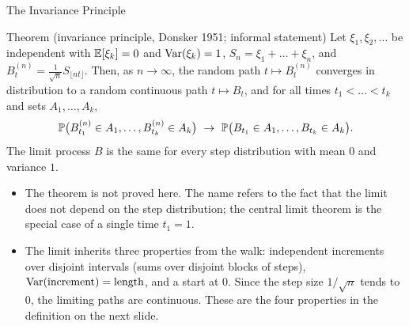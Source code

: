 \begin{frame}{The Invariance Principle}
  \label{fr:invariance}
  \small
  \begin{block}{Theorem (invariance principle, Donsker 1951; informal statement)}
    Let $\xi_1,\xi_2,\dots$ be independent with $\mathbb{E}[\xi_k]=0$ and $\operatorname{Var}(\xi_k)=1$, $S_n=\xi_1+\dots+\xi_n$, and $B^{(n)}_t=\tfrac1{\sqrt n}S_{\lfloor nt\rfloor}$. Then, as $n\to\infty$, the random path $t\mapsto B^{(n)}_t$ converges in distribution to a random continuous path $t\mapsto B_t$, and for all times $t_1<\dots<t_k$ and sets $A_1,\dots,A_k$,
    \[
      \mathbb{P}\big(B^{(n)}_{t_1}\in A_1,\dots,B^{(n)}_{t_k}\in A_k\big)\ \to\ \mathbb{P}\big(B_{t_1}\in A_1,\dots,B_{t_k}\in A_k\big).
    \]
    The limit process $B$ is the same for every step distribution with mean $0$ and variance $1$.
  \end{block}
  \begin{itemize}
    \item The theorem is not proved here. The name refers to the fact that the limit does not depend on the step distribution; the central limit theorem is the special case of a single time $t_1=1$.
    \item The limit inherits three properties from the walk: independent increments over disjoint intervals (sums over disjoint blocks of steps), $\operatorname{Var}(\text{increment})=\text{length}$, and a start at $0$. Since the step size $1/\sqrt n$ tends to $0$, the limiting paths are continuous. These are the four properties in the definition on the next slide.
  \end{itemize}
\end{frame}

